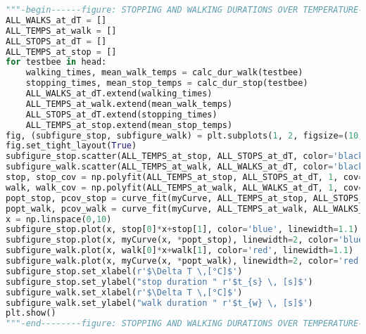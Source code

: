 \begin{lstlisting}[language=Python, basicstyle=\tiny, frame=single, keywordstyle=\color{teal}, commentstyle=\color{olive}, stringstyle=\color{red}]
"""-begin------figure: STOPPING AND WALKING DURATIONS OVER TEMPERATURE-------"""
ALL_WALKS_at_dT = []
ALL_TEMPS_at_walk = []
ALL_STOPS_at_dT = []
ALL_TEMPS_at_stop = []
for testbee in head:
    walking_times, mean_walk_temps = calc_dur_walk(testbee)
    stopping_times, mean_stop_temps = calc_dur_stop(testbee)
    ALL_WALKS_at_dT.extend(walking_times)
    ALL_TEMPS_at_walk.extend(mean_walk_temps)
    ALL_STOPS_at_dT.extend(stopping_times)
    ALL_TEMPS_at_stop.extend(mean_stop_temps)
fig, (subfigure_stop, subfigure_walk) = plt.subplots(1, 2, figsize=(10,5))
fig.set_tight_layout(True)
subfigure_stop.scatter(ALL_TEMPS_at_stop, ALL_STOPS_at_dT, color='black', alpha=0.1)
subfigure_walk.scatter(ALL_TEMPS_at_walk, ALL_WALKS_at_dT, color='black', alpha=0.1)
stop, stop_cov = np.polyfit(ALL_TEMPS_at_stop, ALL_STOPS_at_dT, 1, cov=True)
walk, walk_cov = np.polyfit(ALL_TEMPS_at_walk, ALL_WALKS_at_dT, 1, cov=True)
popt_stop, pcov_stop = curve_fit(myCurve, ALL_TEMPS_at_stop, ALL_STOPS_at_dT, maxfev = 200000, p0=(4,4))
popt_walk, pcov_walk = curve_fit(myCurve, ALL_TEMPS_at_walk, ALL_WALKS_at_dT, maxfev = 200000, p0=(1,1))
x = np.linspace(0,10)
subfigure_stop.plot(x, stop[0]*x+stop[1], color='blue', linewidth=1.1)
subfigure_stop.plot(x, myCurve(x, *popt_stop), linewidth=2, color='blue', linestyle='dashed')#, linewidth=1)
subfigure_walk.plot(x, walk[0]*x+walk[1], color='red', linewidth=1.1)
subfigure_walk.plot(x, myCurve(x, *popt_walk), linewidth=2, color='red', linestyle='dashed')#, linewidth=1)
subfigure_stop.set_xlabel(r'$\Delta T \,[°C]$')
subfigure_stop.set_ylabel("stop duration " r'$t_{s} \, [s]$')
subfigure_walk.set_xlabel(r'$\Delta T \,[°C]$')
subfigure_walk.set_ylabel("walk duration " r'$t_{w} \, [s]$')
plt.show()
"""-end--------figure: STOPPING AND WALKING DURATIONS OVER TEMPERATURE-------"""


\end{lstlisting}
